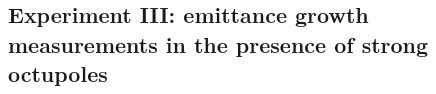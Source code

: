  \newpage
 \subsection{Experiment III: emittance growth measurements in the presence of strong octupoles}\label{subsec:emit_growth_cc_md_sep2022}

 
